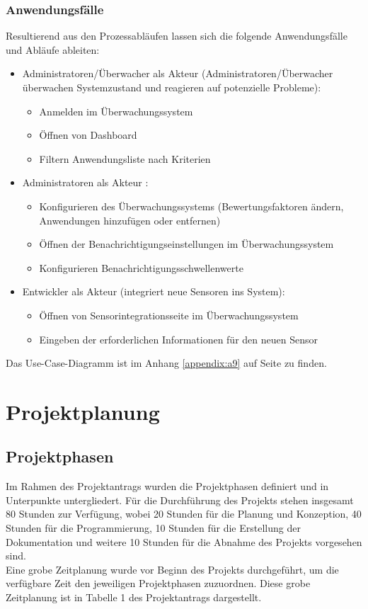 \begin{flushleft}
\subsubsection{Anwendungsfälle}
Resultierend aus den Prozessabläufen lassen sich die folgende Anwendungsfälle und Abläufe ableiten:
\begin{itemize}
	\item Administratoren/Überwacher als Akteur (Administratoren/Überwacher überwachen Systemzustand und reagieren auf potenzielle Probleme):
	\begin{itemize}
		\item Anmelden im Überwachungssystem
		\item Öffnen von Dashboard
		\item Filtern Anwendungsliste nach Kriterien

	\end{itemize}
	\item Administratoren als Akteur :
		\begin{itemize}
			\item Konfigurieren des Überwachungssystems (Bewertungsfaktoren ändern, Anwendungen hinzufügen oder entfernen)
			\item Öffnen der Benachrichtigungseinstellungen im Überwachungssystem
			\item Konfigurieren Benachrichtigungsschwellenwerte
		\end{itemize}
	\item Entwickler als Akteur (integriert neue Sensoren ins System):
		\begin{itemize}
				\item  Öffnen von Sensorintegrationsseite im Überwachungssystem
				\item  Eingeben der erforderlichen Informationen für den neuen Sensor
		\end{itemize}
\end{itemize}
Das Use-Case-Diagramm ist im Anhang \ref{appendix:a9} auf Seite \pageref{appendix:a9} zu finden.

	\section{Projektplanung}

	\subsection{Projektphasen}
	Im Rahmen des Projektantrags wurden die Projektphasen definiert und in Unterpunkte untergliedert. Für die Durchführung des Projekts stehen insgesamt 80 Stunden zur Verfügung, wobei 20 Stunden für die Planung und Konzeption, 40 Stunden für die Programmierung, 10 Stunden für die Erstellung der Dokumentation und weitere 10 Stunden für die Abnahme des Projekts vorgesehen sind.
	\\
	Eine grobe Zeitplanung wurde vor Beginn des Projekts durchgeführt, um die verfügbare Zeit den jeweiligen Projektphasen zuzuordnen. Diese grobe Zeitplanung ist in Tabelle 1 des Projektantrags dargestellt.


\end{flushleft}
